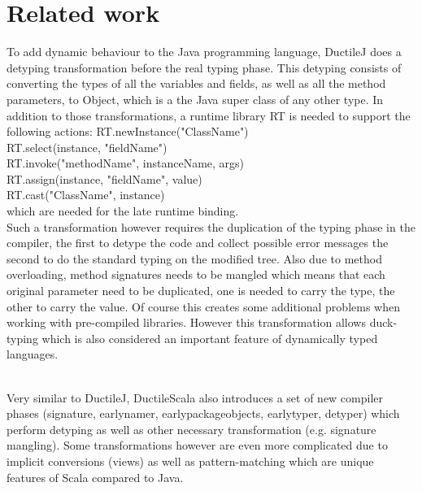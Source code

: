 \section{Related work}


To add dynamic behaviour to the Java programming language, DuctileJ does a detyping transformation before the real typing phase. This detyping consists of converting the types of all the variables and fields, as well as all the method parameters, to {\ttfamily Object}, which is a the Java super class of any other type. In addition to those transformations, a runtime library {\ttfamily RT} is needed to support the following actions:
{\ttfamily
RT.newInstance("ClassName")\\
RT.select(instance, "fieldName")\\
RT.invoke("methodName", instanceName, args)\\
RT.assign(instance, "fieldName", value)\\
RT.cast("ClassName", instance)\\	
}
which are needed for the late runtime binding.\\
Such a transformation however requires the duplication of the typing phase in the compiler, the first to detype the code and collect possible error messages the second to do the standard typing on the modified tree. Also due to method overloading, method signatures needs to be mangled which means that each original parameter need to be duplicated, one is needed to carry the type, the other to carry the value. Of course this creates some additional problems when working with pre-compiled libraries. However this transformation allows duck-typing which is also considered an important feature of dynamically typed languages.
\\
\\

Very similar to DuctileJ, DuctileScala also introduces a set of new compiler phases ({\ttfamily signature, earlynamer, earlypackageobjects, earlytyper, detyper}) which perform detyping as well as other necessary transformation (e.g. signature mangling). Some transformations however are even more complicated due to implicit conversions (views) as well as pattern-matching which are unique features of Scala compared to Java.
\\
\\

